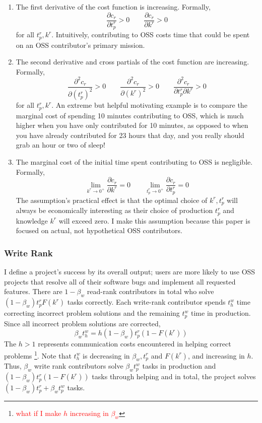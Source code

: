\documentclass[source/paper/main.tex]{subfiles}
\begin{document}
\begin{enumerate}
    
    \item The first derivative of the cost function is increasing. Formally, 
    $$\frac{\partial c_r}{\partial t_p^r}>0 \qquad \frac{\partial c_r}{\partial k^r}>0$$
    for all $t_p^r, k^r$. Intuitively, contributing to OSS costs time that could be spent on an OSS contributor's primary mission. 
    \item The second derivative and cross partials of the cost function are increasing. Formally, $$\frac{\partial^2 c_r}{\partial (t_p^r)^2}>0 \qquad \frac{\partial^2 c_r}{\partial (k^r)^2}>0 \qquad \frac{\partial^2 c_r}{\partial t_p^r \partial k^r}>0$$
    for all $t_p^r, k^r$. An extreme but helpful motivating example is to compare the marginal cost of spending 10 minutes contributing to OSS, which is much higher when you have only contributed for 10 minutes, as opposed to when you have already contributed for 23 hours that day, and you really should grab an hour or two of sleep! 
    \item The marginal cost of the initial time spent contributing to OSS is negligible. Formally, $$\lim_{k^r \to 0^+} \frac{\partial c_r}{\partial k^r} = 0 \qquad  \lim_{t_p^r \to 0^+} \frac{\partial c_r}{\partial t_p^r} = 0$$
    The assumption's practical effect is that the optimal choice of $k^r, t_p^r$ will always be economically interesting as their choice of production $t_p^r$ and knowledge $k^r$ will exceed zero. I make this assumption because this paper is focused on actual, not hypothetical OSS contributors.
\end{enumerate}


\subsubsection{Write Rank}
I define a project's success by its overall output; users are more likely to use OSS projects that resolve all of their software bugs and implement all requested features. There are $1-\beta_w$ read-rank contributors in total who solve $(1-\beta_w) t_p^rF(k^r)$ tasks correctly. 
Each write-rank contributor spends $t_h^w$ time correcting incorrect problem solutions and the remaining $t_p^w$ time in production. Since all incorrect problem solutions are corrected, 
$$\beta_w t_h^w = h (1-\beta_w) t_p^r(1-F(k^r))$$
The $h>1$ represents communication costs encountered in helping correct problems \footnote{ \textcolor{red}{what if I make $h$ increasing in $\beta_w$} }. Note that $t_h^w$ is decreasing in $\beta_w, t_p^r$ and $F(k^r)$, and increasing in $h$. Thus, $\beta_w$ write rank contributors solve $\beta_w t_p^w$ tasks in production and $(1-\beta_w) t_p^r(1-F(k^r))$ tasks through helping and in total, the project solves $(1-\beta_w) t_p^r + \beta_w t_p^w$ tasks.
\end{document}
